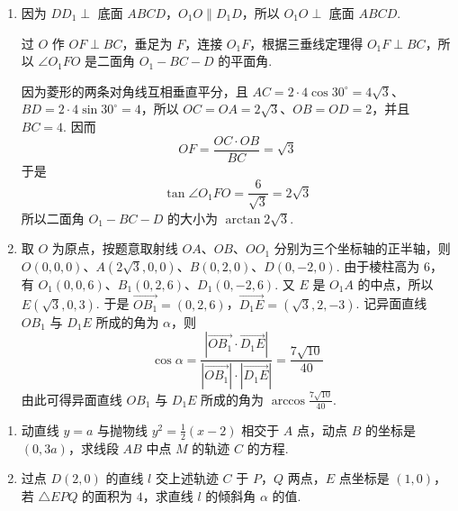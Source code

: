 \begin{solution}
\begin{enumerate}
\item 因为 \(DD_{1}\perp\) 底面 \(ABCD\)，\(O_{1}O\parallel D_{1}D\)，所以 \(O_{1}O\perp\) 底面 \(ABCD\).

过 \(O\) 作 \(OF\perp BC\)，垂足为 \(F\)，连接 \(O_{1}F\)，根据三垂线定理得 \(O_{1}F\perp BC\)，所以 \(\angle O_{1}FO\) 是二面角 \(O_{1}-BC-D\) 的平面角.

因为菱形的两条对角线互相垂直平分，且 \(AC=2\cdot4\cos30^\circ=4\sqrt{3}\)、\(BD=2\cdot4\sin30^\circ=4\)，所以 \(OC=OA=2\sqrt{3}\)、\(OB=OD=2\)，并且 \(BC=4\). 因而
\[
OF=\frac{OC\cdot OB}{BC}=\sqrt{3}
\]
于是
\[
\tan\angle O_{1}FO=\frac{6}{\sqrt{3}}=2\sqrt{3}
\]
所以二面角 \(O_{1}-BC-D\) 的大小为 \(\arctan 2\sqrt{3}\).

\item 取 \(O\) 为原点，按题意取射线 \(OA\)、\(OB\)、\(OO_1\) 分别为三个坐标轴的正半轴，则 \(O(0,0,0)\)、\(A(2\sqrt{3},0,0)\)、\(B(0,2,0)\)、\(D(0,-2,0)\). 由于棱柱高为 \(6\)，有 \(O_1(0,0,6)\)、\(B_1(0,2,6)\)、\(D_1(0,-2,6)\). 又 \(E\) 是 \(O_1A\) 的中点，所以 \(E(\sqrt{3},0,3)\).
于是 \(\overrightarrow{OB_{1}}=(0,2,6)\)，\(\overrightarrow{D_{1}E}=(\sqrt{3},2,-3)\).
记异面直线 \(OB_{1}\) 与 \(D_{1}E\) 所成的角为 \(\alpha\)，则
\[
\cos\alpha=\frac{|\overrightarrow{OB_{1}}\cdot\overrightarrow{D_{1}E}|}{|\overrightarrow{OB_{1}}|\cdot|\overrightarrow{D_{1}E}|}
=\frac{7\sqrt{10}}{40}
\]
由此可得异面直线 \(OB_{1}\) 与 \(D_{1}E\) 所成的角为 \(\arccos\frac{7\sqrt{10}}{40}\).
\end{enumerate}
\end{solution}

\begin{problem}
\begin{enumerate}
\item 动直线 \(y = a\) 与抛物线 \(y^{2} = \frac{1}{2}(x - 2) \) 相交于 \(A\) 点，动点 \(B\) 的坐标是 \((0, 3a) \)，求线段 \(AB\) 中点 \(M\) 的轨迹 \(C\) 的方程.
\item 过点 \(D(2,0)\) 的直线 \(l\) 交上述轨迹 \(C\) 于 \(P\)，\(Q\) 两点，\(E\) 点坐标是 \((1,0)\)，若 \(\triangle EPQ\) 的面积为 \(4\)，求直线 \(l\) 的倾斜角 \(\alpha \) 的值.
\end{enumerate}
\end{problem}

